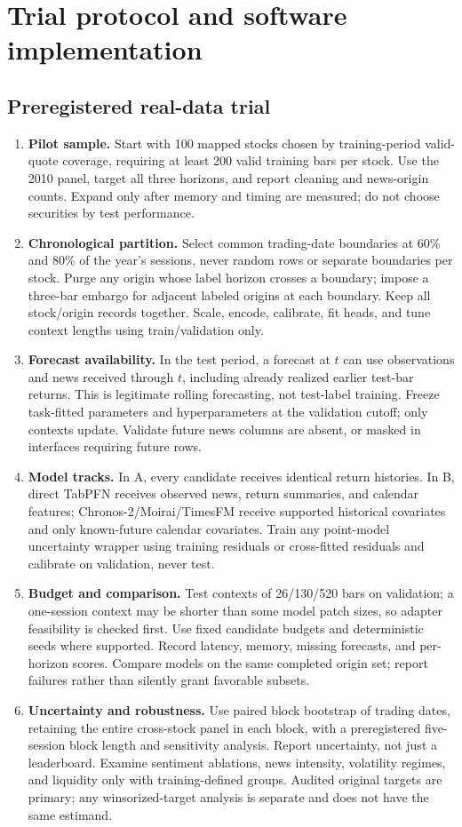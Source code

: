 \documentclass[11pt,letterpaper]{article}
\begin{document}
\section{Trial protocol and software implementation}
\subsection{Preregistered real-data trial}
\begin{enumerate}
\item \textbf{Pilot sample.} Start with 100 mapped stocks chosen by training-period valid-quote coverage, requiring at least 200 valid training bars per stock. Use the 2010 panel, target all three horizons, and report cleaning and news-origin counts. Expand only after memory and timing are measured; do not choose securities by test performance.
\item \textbf{Chronological partition.} Select common trading-date boundaries at 60\% and 80\% of the year's sessions, never random rows or separate boundaries per stock. Purge any origin whose label horizon crosses a boundary; impose a three-bar embargo for adjacent labeled origins at each boundary. Keep all stock/origin records together. Scale, encode, calibrate, fit heads, and tune context lengths using train/validation only.
\item \textbf{Forecast availability.} In the test period, a forecast at $t$ can use observations and news received through $t$, including already realized earlier test-bar returns. This is legitimate rolling forecasting, not test-label training. Freeze task-fitted parameters and hyperparameters at the validation cutoff; only contexts update. Validate future news columns are absent, or masked in interfaces requiring future rows.
\item \textbf{Model tracks.} In A, every candidate receives identical return histories. In B, direct TabPFN receives observed news, return summaries, and calendar features; Chronos-2/Moirai/TimesFM receive supported historical covariates and only known-future calendar covariates. Train any point-model uncertainty wrapper using training residuals or cross-fitted residuals and calibrate on validation, never test.
\item \textbf{Budget and comparison.} Test contexts of 26/130/520 bars on validation; a one-session context may be shorter than some model patch sizes, so adapter feasibility is checked first. Use fixed candidate budgets and deterministic seeds where supported. Record latency, memory, missing forecasts, and per-horizon scores. Compare models on the same completed origin set; report failures rather than silently grant favorable subsets.
\item \textbf{Uncertainty and robustness.} Use paired block bootstrap of trading dates, retaining the entire cross-stock panel in each block, with a preregistered five-session block length and sensitivity analysis. Report uncertainty, not just a leaderboard. Examine sentiment ablations, news intensity, volatility regimes, and liquidity only with training-defined groups. Audited original targets are primary; any winsorized-target analysis is separate and does not have the same estimand.
\end{enumerate}
\end{document}
